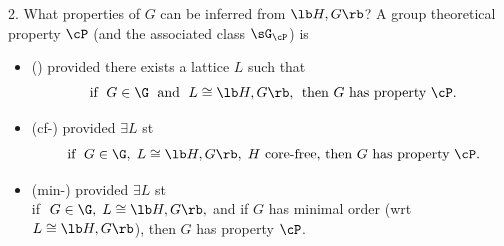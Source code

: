 \begin{frame}[label=IEProps]{2. What properties of $G$ can be inferred from $\lb H,G \rb$?}
A group theoretical property $\cP$  (and the associated class $\sG_\cP$) is
\vskip2mm
\begin{itemize}
\item 
{} (\IE) provided there exists a lattice
$L$ such that
\[
\text{ if $\;G\in \G\;$ and $\;L\cong \lb H,G \rb,\;$  then $G$ has property $\cP$.}
\]
\vskip2mm

\item
{} (cf-\IE) provided
$\exists L$ st
\[
\text{ if $\;G\in \G,\; L\cong \lb H,G \rb,\;H$ core-free, then $G$ has property $\cP$.}
\]
\vskip2mm

\item 
{} (min-\IE)
provided $\exists L$ st\\ 
if $\;G\in \G,\; L\cong \lb H,G \rb,$ and if $G$ has minimal order (wrt
$L\cong \lb H,G \rb$), then $G$ has property $\cP$.    
\end{itemize}

\end{frame}


